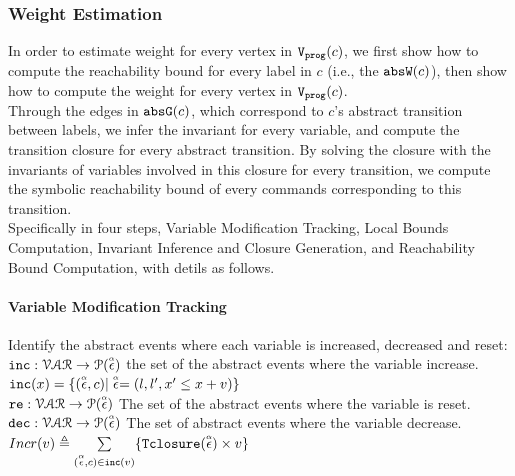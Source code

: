 \subsubsection{Weight Estimation}
\label{sec:alg_weightgen}
%
In order to estimate weight for every vertex in $\mathtt{{V_{prog}}}(c)$,
we first show how to compute the reachability bound for every label in $c$
(i.e., the $\mathtt{abs}{\mathtt{W}}(c)$), 
then show how to compute the weight for every vertex in $\mathtt{{V_{prog}}}(c)$.
\\
Through the edges in $\mathtt{abs}{\mathtt{G}}(c)$, which correspond to $c$'s abstract transition between labels,
we infer the invariant for every variable, and compute the transition closure for every abstract transition. By solving the closure
with the invariants of variables involved in this closure for every transition, we compute
the symbolic reachability bound of every commands corresponding to this transition.
\\
Specifically in four steps, Variable Modification Tracking, Local Bounds Computation,
Invariant Inference and Closure Generation, and Reachability Bound Computation,
% 
with detils as follows.
%
\paragraph*{Variable Modification Tracking}
Identify the abstract events where each variable is increased, decreased and reset:
\\
$\mathtt{inc}: \mathcal{VAR} \to \mathcal{P}(\stackrel{\scriptscriptstyle{\alpha}}{\mathtt{\epsilon}{}}) $
the set of the abstract events where the variable increase.
\\
$\mathtt{inc}(x) = \{(\stackrel{\scriptscriptstyle{\alpha}}{\mathtt{\epsilon}{}}, c) | \stackrel{\scriptscriptstyle{\alpha}}{\mathtt{\epsilon}{}} = (l, l', x' \leq x + v)\}$
\\
$\mathtt{re}: \mathcal{VAR} \to \mathcal{P}(\stackrel{\scriptscriptstyle{\alpha}}{\mathtt{\epsilon}{}}) $
The set of the abstract events where the variable is reset.
\\
$\mathtt{dec}: \mathcal{VAR} \to \mathcal{P}(\stackrel{\scriptscriptstyle{\alpha}}{\mathtt{\epsilon}{}}) $
The set of abstract events where the variable decrease.
\\
$Incr(v) \triangleq \sum\limits_{(\stackrel{\scriptscriptstyle{\alpha}}{\mathtt{\epsilon}{}}, c) \in \mathtt{inc}(v)}\{{\mathtt{Tclosure}}(\stackrel{\scriptscriptstyle{\alpha}}{\mathtt{\epsilon}{}}) \times v\}$
%
